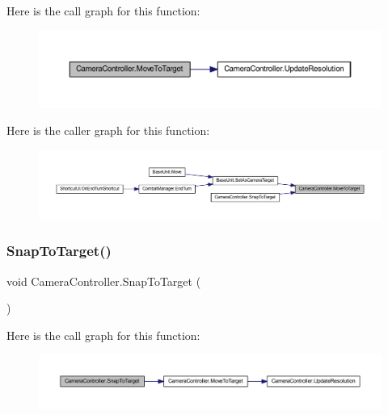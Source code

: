 Here is the call graph for this function\+:\nopagebreak
\begin{figure}[H]
\begin{center}
\leavevmode
\includegraphics[width=350pt]{class_camera_controller_a79831008bb764801df46a3c91343a524_cgraph}
\end{center}
\end{figure}
Here is the caller graph for this function\+:\nopagebreak
\begin{figure}[H]
\begin{center}
\leavevmode
\includegraphics[width=350pt]{class_camera_controller_a79831008bb764801df46a3c91343a524_icgraph}
\end{center}
\end{figure}
\mbox{\label{class_camera_controller_a9e2d7df7c696c1c2ce48384933c5d1ab}} 
\subsubsection{\texorpdfstring{SnapToTarget()}{SnapToTarget()}}
{\footnotesize\ttfamily void Camera\+Controller.\+Snap\+To\+Target (\begin{DoxyParamCaption}{ }\end{DoxyParamCaption})}

Here is the call graph for this function\+:\nopagebreak
\begin{figure}[H]
\begin{center}
\leavevmode
\includegraphics[width=350pt]{class_camera_controller_a9e2d7df7c696c1c2ce48384933c5d1ab_cgraph}
\end{center}
\end{figure}
\mbox{\label{class_camera_controller_a4894dc3111b871a8bf5ff422d30c1689}} 
